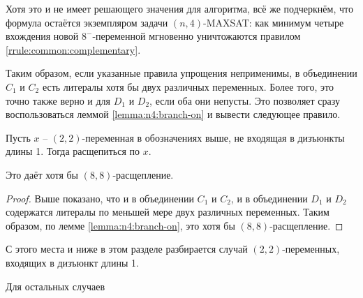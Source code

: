 Хотя это и не имеет решающего значения для алгоритма, всё же подчеркнём, что формула остаётся экземпляром задачи $(n,4)$-MAXSAT: как минимум четыре вхождения новой $8^-$-переменной мгновенно уничтожаются правилом \ref{rrule:common:complementary}.

Таким образом, если указанные правила упрощения неприменимы, в объединении $C_1$ и $C_2$ есть литералы хотя бы двух различных переменных.
Более того, это точно также верно и для $D_1$ и $D_2$, если оба они непусты.
Это позволяет сразу воспользоваться леммой \ref{lemma:n4:branch-on} и вывести следующее правило.

\begin{brule}
 Пусть $x$ -- $(2,2)$-переменная в обозначениях выше, не входящая в дизъюнкты длины 1. Тогда расщепиться по $x$.

 Это даёт хотя бы $(8,8)$-расщепление.
 \label{brule:n4:22:nouc}
\end{brule}

\begin{proof}
 Выше показано, что и в объединении $C_1$ и $C_2$, и в объединении $D_1$ и $D_2$ содержатся литералы по меньшей мере двух различных переменных. Таким образом, по лемме \ref{lemma:n4:branch-on}, это хотя бы $(8,8)$-расщепление.
\end{proof}

С этого места и ниже в этом разделе разбирается случай $(2,2)$-переменных, входящих в дизъюнкт длины 1.

Для остальных случаев 


